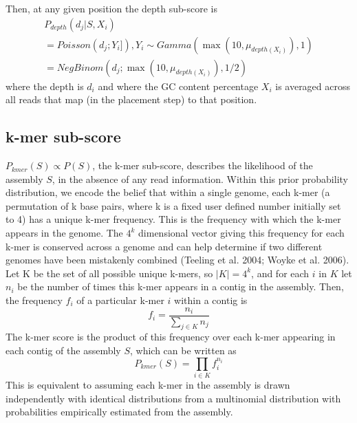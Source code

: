 \documentclass[phd,tocprelim]{cornell}
\begin{document}
Then, at any given position the depth sub-score is
\begin{equation}
    \begin{array}{l}
        P_{depth}\left(d_{j}|S,X_{i}\right) \\
        = Poisson\left(d_{j};Y_{i}]\right), Y_{i} \sim Gamma(\max(10,\mu_{depth(X_{i})}), 1) \\
        = NegBinom(d_{j}; \max(10, \mu_{depth(X_{i})}), 1/2)
    \end{array}
\end{equation}
where the depth is $d_{i}$ and where the GC content percentage $X_{i}$ is averaged across all reads that map (in the placement step) to that position.


\subsection{k-mer sub-score} %
\label{sub:k-mer sub-score}

$P_{kmer}(S) \propto P(S)$, the k-mer sub-score, describes the likelihood of the assembly $S$, in the absence of any read information.  Within this prior probability distribution, we encode the belief that within a single genome, each k-mer (a permutation of k base pairs, where k is a fixed user defined number initially set to 4) has a unique k-mer frequency. This is the frequency with which the k-mer appears in the genome.  The $4^{k}$ dimensional vector giving this frequency for each k-mer is conserved across a genome and can help determine if two different genomes have been mistakenly combined (Teeling et al. 2004; Woyke et al. 2006). Let K be the set of all possible unique k-mers, so $|K| = 4^{k}$, and for each $i$ in $K$ let $n_{i}$ be the number of times this k-mer appears in a contig in the assembly. Then, the frequency $f_{i}$ of a particular k-mer $i$ within a contig is
\begin{equation}
    f_{i} = \frac{n_{i}}{\sum_{j\in K}n_{j}}
\end{equation}
The k-mer score is the product of this frequency over each k-mer appearing in each contig of the assembly $S$, which can be written as
\begin{equation}
    P_{kmer}(S) = \prod_{i\in K} f_{i}^{n_{i}}
\end{equation}
This is equivalent to assuming each k-mer in the assembly is drawn independently with identical distributions from a multinomial distribution with probabilities empirically estimated from the assembly.
\end{document}
